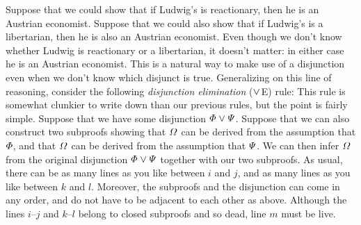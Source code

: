 Suppose that we could show that if Ludwig's is reactionary, then he is an Austrian economist.
Suppose that we could also show that if Ludwig's is a libertarian, then he is also an Austrian economist.
Even though we don't know whether Ludwig is reactionary or a libertarian, it doesn't matter: in either case he is an Austrian economist.
This is a natural way to make use of a disjunction even when we don't know which disjunct is true.
Generalizing on this line of reasoning, consider the following \textit{disjunction elimination} ($\mkern1mu\vee\mkern1mu$E) rule:
This rule is somewhat clunkier to write down than our previous rules, but the point is fairly simple.
Suppose that we have some disjunction $\varPhi \mkern1mu\vee\mkern1mu \varPsi$.
Suppose that we can also construct two subproofs showing that $\varOmega$ can be derived from the assumption that $\varPhi$, and that $\varOmega$ can be derived from the assumption that $\varPsi$.
We can then infer $\varOmega$ from the original disjunction $\varPhi \mkern1mu\vee\mkern1mu \varPsi$ together with our two subproofs.
As usual, there can be as many lines as you like between $i$ and $j$, and as many lines as you like between $k$ and $l$.
Moreover, the subproofs and the disjunction can come in any order, and do not have to be adjacent to each other as above.
Although the lines $i$--$j$ and $k$--$l$ belong to closed subproofs and so dead, line $m$ must be live.

